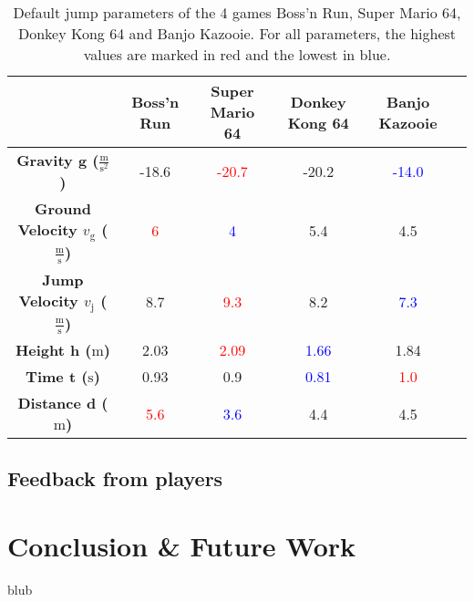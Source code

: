 \documentclass[letterpaper, 10 pt, conference]{ieeeconf}  %
\begin{document}
\begin{table*}[htbp]
    \centering
    \begin{tabular}{cccccc}
    \toprule
     & \textbf{Boss'n Run} & \textbf{Super Mario 64} & \textbf{Donkey Kong 64} & \textbf{Banjo Kazooie} \\
    \midrule
    \textbf{Gravity g ($\frac{\mathrm{m}}{\mathrm{s^2}}$)} & -18.6 & \textcolor{red}{-20.7} & -20.2 & \textcolor{blue}{-14.0} \\
    \textbf{Ground Velocity $v_{\text{g}}$ ($\frac{\mathrm{m}}{\mathrm{s}}$)} & \textcolor{red}{6} & \textcolor{blue}{4} & 5.4 & 4.5 \\
    \textbf{Jump Velocity $v_{\text{j}}$ ($\frac{\mathrm{m}}{\mathrm{s}}$)} & 8.7 & \textcolor{red}{9.3} & 8.2 & \textcolor{blue}{7.3} \\
    \textbf{Height h ($\mathrm{m}$)} & 2.03 & \textcolor{red}{2.09} & \textcolor{blue}{1.66} & 1.84 \\
    \textbf{Time t ($\mathrm{s}$)} & 0.93 & 0.9 & \textcolor{blue}{0.81} & \textcolor{red}{1.0} \\
    \textbf{Distance d ($\mathrm{m}$)} & \textcolor{red}{5.6} & \textcolor{blue}{3.6} & 4.4 & 4.5 \\
    \bottomrule
    \end{tabular}
    \caption{Default jump parameters of the 4 games Boss'n Run, Super Mario 64, Donkey Kong 64 and Banjo Kazooie.
    For all parameters, the highest values are marked in red and the lowest in blue.}
    \label{tab:insightIII}
\end{table*}


\subsection{Feedback from players}


\section{Conclusion \& Future Work}
\label{Sec:ConcFuture}

blub

\end{document}
